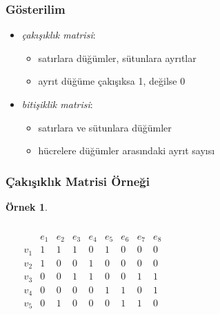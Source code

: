 \documentclass[dvipsnames]{beamer}
\theoremstyle{definition}
\theoremstyle{example}
\newtheorem{ornek}[theorem]{Örnek}
\theoremstyle{plain}
\begin{document}
\begin{frame}
  \frametitle{Gösterilim}

  \begin{itemize}
    \item \emph{çakışıklık matrisi}:
    \begin{itemize}
      \item satırlara düğümler, sütunlara ayrıtlar
      \item ayrıt düğüme çakışıksa 1, değilse 0
    \end{itemize}

    \pause
    \medskip
    \item \emph{bitişiklik matrisi}:
    \begin{itemize}
      \item satırlara ve sütunlara düğümler
      \item hücrelere düğümler arasındaki ayrıt sayısı
    \end{itemize}
  \end{itemize}
\end{frame}

\begin{frame}
  \frametitle{Çakışıklık Matrisi Örneği}

  \begin{ornek}
    \begin{columns}
      \begin{center}
      \end{center}

      \[
        \begin{array}{c|cccccccc}
              & e_1 & e_2 & e_3 & e_4 & e_5 & e_6 & e_7 & e_8\\\hline
          v_1 & 1 & 1 & 1 & 0 & 1 & 0 & 0 & 0\\
          v_2 & 1 & 0 & 0 & 1 & 0 & 0 & 0 & 0\\
          v_3 & 0 & 0 & 1 & 1 & 0 & 0 & 1 & 1\\
          v_4 & 0 & 0 & 0 & 0 & 1 & 1 & 0 & 1\\
          v_5 & 0 & 1 & 0 & 0 & 0 & 1 & 1 & 0
        \end{array}
      \]
    \end{columns}
  \end{ornek}
\end{frame}
\end{document}
